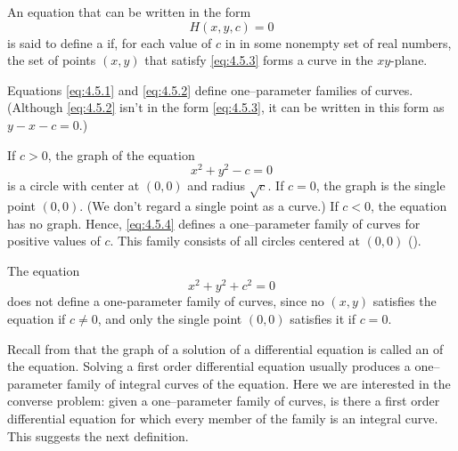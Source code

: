 \begin{definition}\label{thmtype:4.5.1}
An equation that can be written in the form
\begin{equation} \label{eq:4.5.3}
H(x,y,c)=0
\end{equation}
is said to define a  if, for
each value of $c$ in in some nonempty set of real numbers, the set of
points $(x,y)$ that satisfy \eqref{eq:4.5.3} forms a curve in the
$xy$-plane.
\end{definition}

Equations \eqref{eq:4.5.1} and \eqref{eq:4.5.2} define one--parameter families
of curves. (Although \eqref{eq:4.5.2} isn't  in the form \eqref{eq:4.5.3}, it
can be written in this form as $y-x-c=0$.)



\begin{example}\label{example:4.5.3}
If $c>0$,  the graph of the equation
\begin{equation} \label{eq:4.5.4}
x^2+y^2-c=0
\end{equation}
is a circle with center at $(0,0)$ and radius $\sqrt{c}$. If $c=0$, the
graph is the single point $(0,0)$. (We don't regard a single point as
a curve.) If $c<0$, the equation has no graph. Hence, \eqref{eq:4.5.4}
defines a one--parameter family of curves for positive values of $c$.
This family consists of all circles centered at $(0,0)$
().
\end{example}




\begin{example}\label{example:4.5.4}
 The equation
\[
x^2+y^2+c^2=0
\]
does not define a one-parameter family of curves, since no $(x,y)$
satisfies the equation if $c\ne0$, and only the single point $(0,0)$
satisfies it if $c=0$.
\end{example}


Recall from  that the graph of a solution of a
differential equation is called an  of the
equation. Solving a first order differential equation usually produces
a one--parameter family of integral curves of the equation. Here we
are interested in the converse problem:
given a one--parameter family of curves, is there a first order
differential equation for which every  member of the family is an integral
curve.
This suggests the next definition.

